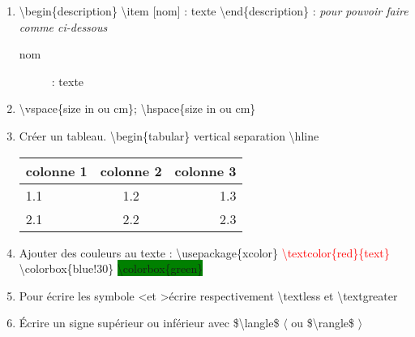 \documentclass[12pt, letterpaper]{article}
\begin{document}
\begin{enumerate}
\item \textbackslash begin\{description\} \textbackslash item [nom] : texte \textbackslash end\{description\} : \textit{pour pouvoir faire comme ci-dessous}
\begin{description}
\item [nom] : texte
\end{description}
\item \textbackslash vspace\{size in ou cm\}; \textbackslash hspace\{size in ou cm\}
\item Créer un tableau. \textbackslash begin\{tabular\} vertical separation \textbackslash hline
\newline \begin{tabular}{|l|c|r|}
  \hline
  colonne 1 & colonne 2 & colonne 3 \\
  \hline
  1.1 & 1.2 & 1.3 \\ \hline
  2.1 & 2.2 & 2.3 \\
  \hline
\end{tabular}
\item Ajouter des couleurs au texte : \textbackslash usepackage\{xcolor\}
\newline \textcolor{red}{\textbackslash textcolor\{red\}\{text\}}
\newline \colorbox{blue!30}{\textbackslash colorbox\{blue!30\}}
\newline \colorbox{green}{\textbackslash colorbox\{green\}}
\item Pour écrire les symbole \textless et \textgreater écrire respectivement \textbackslash textless et \textbackslash textgreater
\item Écrire un signe supérieur ou inférieur avec \$\textbackslash langle\$ $\langle$ ou \$\textbackslash rangle\$ $\rangle$
\end{enumerate}
\end{document}
